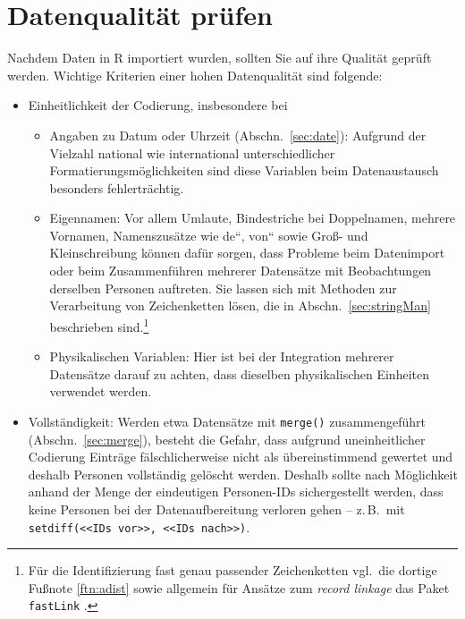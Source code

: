 \section{Datenqualität prüfen}
\label{sec:tidyData}

Nachdem Daten in R importiert wurden, sollten Sie auf ihre Qualität geprüft werden. Wichtige Kriterien einer hohen Datenqualität sind folgende:
\begin{itemize}
\item Einheitlichkeit der Codierung, insbesondere bei
\begin{itemize}
\item Angaben zu Datum oder Uhrzeit (Abschn.\ \ref{sec:date}): Aufgrund der Vielzahl national wie international unterschiedlicher Formatierungsmöglichkeiten sind diese Variablen beim Datenaustausch besonders fehlerträchtig.
\item Eigennamen: Vor allem Umlaute, Bindestriche bei Doppelnamen, mehrere Vornamen, Namenszusätze wie {\quotedblbase}de{\textquotedblleft}, {\quotedblbase}von{\textquotedblleft} sowie Groß- und Kleinschreibung können dafür sorgen, dass Probleme beim Datenimport oder beim Zusammenführen mehrerer Datensätze mit Beobachtungen derselben Personen auftreten. Sie lassen sich mit Methoden zur Verarbeitung von Zeichenketten lösen, die in Abschn.\ \ref{sec:stringMan} beschrieben sind.\footnote{\label{ftn:recLink}Für die Identifizierung fast genau passender Zeichenketten vgl.\ die dortige Fußnote \ref{ftn:adist} sowie allgemein für Ansätze zum \emph{record linkage} das Paket \lstinline!fastLink! \cite{Enamorado2018}.}
\item Physikalischen Variablen: Hier ist bei der Integration mehrerer Datensätze darauf zu achten, dass dieselben physikalischen Einheiten verwendet werden.
\end{itemize}
\item Vollständigkeit: Werden etwa Datensätze mit \lstinline!merge()! zusammengeführt (Abschn.\ \ref{sec:merge}), besteht die Gefahr, dass aufgrund uneinheitlicher Codierung Einträge fälschlicherweise nicht als übereinstimmend gewertet und deshalb Personen vollständig gelöscht werden. Deshalb sollte nach Möglichkeit anhand der Menge der eindeutigen Personen-IDs sichergestellt werden, dass keine Personen bei der Datenaufbereitung verloren gehen -- z.\,B.\ mit \lstinline!setdiff(<<IDs vor>>, <<IDs nach>>)!.

\end{itemize}
